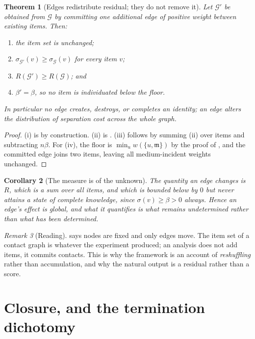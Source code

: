 \documentclass[11pt,a4paper]{article}
\newtheorem{theorem}{Theorem}[section]
\newtheorem{corollary}[theorem]{Corollary}
\theoremstyle{definition}
\theoremstyle{remark}
\newtheorem{remark}[theorem]{Remark}
\newcommand{\Gph}{\mathcal{G}}              %
\newcommand{\wt}{w}                          %
\newcommand{\med}{\mathfrak{m}}              %
\newcommand{\flo}{\beta}                     %
\newcommand{\sep}{\sigma}                    %
\newcommand{\resid}{R}                       %
\begin{document}
\begin{theorem}[Edges redistribute residual; they do not remove it]
\label{thm:residual}
Let $\Gph'$ be obtained from $\Gph$ by committing one additional edge of
positive weight between existing items. Then:
\begin{enumerate}[label=\textup{(\roman*)},leftmargin=2.2em,itemsep=1pt]
  \item the item set is unchanged;
  \item $\sep_{\Gph'}(v)\ge\sep_{\Gph}(v)$ for every item $v$;
  \item $\resid(\Gph')\ge\resid(\Gph)$; and
  \item $\flo'=\flo$, so no item is individuated below the floor.
\end{enumerate}
In particular no edge creates, destroys, or completes an identity; an
edge alters the \emph{distribution} of separation cost across the whole
graph.
\end{theorem}

\begin{proof}
(i) is by construction. (ii) is . (iii) follows by
summing (ii) over items and subtracting $n\flo$. For (iv), the floor is
$\min_u \wt(\{u,\med\})$ by the proof of , and the
committed edge joins two items, leaving all medium-incident weights
unchanged.
\end{proof}

\begin{corollary}[The measure is of the unknown]
\label{cor:unknown}
The quantity an edge changes is $\resid$, which is a sum over all items,
and which is bounded below by $0$ but never attains a state of complete
knowledge, since $\sep(v)\ge\flo>0$ always. Hence an edge's effect is
global, and what it quantifies is what remains undetermined rather than
what has been determined.
\end{corollary}

\begin{remark}[Reading]
\label{rem:inversion}
 says nodes are fixed and only edges move. The item
set of a contact graph is whatever the experiment produced; an analysis
does not add items, it commits contacts. This is why the framework is an
account of \emph{reshuffling} rather than accumulation, and why the
natural output is a residual rather than a score.
\end{remark}

\section{Closure, and the termination dichotomy}
\label{sec:closure}
\end{document}

